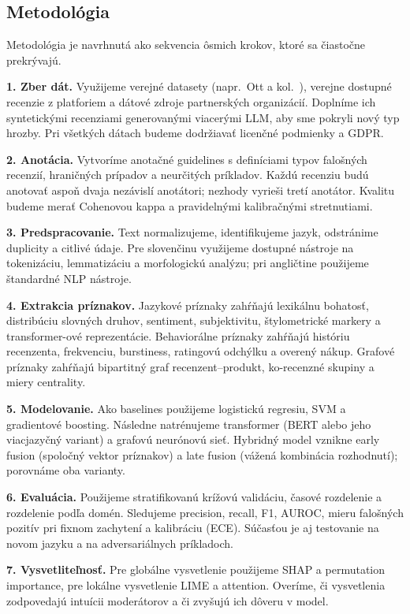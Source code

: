 \documentclass[11pt,a4paper]{article}
\begin{document}
\subsection{Metodológia}

Metodológia je navrhnutá ako sekvencia ôsmich krokov, ktoré sa čiastočne prekrývajú.

\textbf{1. Zber dát.} Využijeme verejné datasety (napr.\ Ott a kol.~\cite{ott2011}), verejne dostupné recenzie z platforiem a dátové zdroje partnerských organizácií. Doplníme ich syntetickými recenziami generovanými viacerými LLM, aby sme pokryli nový typ hrozby. Pri všetkých dátach budeme dodržiavať licenčné podmienky a GDPR.

\textbf{2. Anotácia.} Vytvoríme anotačné guidelines s definíciami typov falošných recenzií, hraničných prípadov a neurčitých príkladov. Každú recenziu budú anotovať aspoň dvaja nezávislí anotátori; nezhody vyrieši tretí anotátor. Kvalitu budeme merať Cohenovou kappa a pravidelnými kalibračnými stretnutiami.

\textbf{3. Predspracovanie.} Text normalizujeme, identifikujeme jazyk, odstránime duplicity a citlivé údaje. Pre slovenčinu využijeme dostupné nástroje na tokenizáciu, lemmatizáciu a morfologickú analýzu; pri angličtine použijeme štandardné NLP nástroje.

\textbf{4. Extrakcia príznakov.} Jazykové príznaky zahŕňajú lexikálnu bohatosť, distribúciu slovných druhov, sentiment, subjektivitu, štylometrické markery a transformer-ové reprezentácie. Behaviorálne príznaky zahŕňajú históriu recenzenta, frekvenciu, burstiness, ratingovú odchýlku a overený nákup. Grafové príznaky zahŕňajú bipartitný graf recenzent--produkt, ko-recenzné skupiny a miery centrality.

\textbf{5. Modelovanie.} Ako baselines použijeme logistickú regresiu, SVM a gradientové boosting. Následne natrénujeme transformer (BERT alebo jeho viacjazyčný variant) a grafovú neurónovú sieť. Hybridný model vznikne early fusion (spoločný vektor príznakov) a late fusion (vážená kombinácia rozhodnutí); porovnáme oba varianty.

\textbf{6. Evaluácia.} Použijeme stratifikovanú krížovú validáciu, časové rozdelenie a rozdelenie podľa domén. Sledujeme precision, recall, F1, AUROC, mieru falošných pozitív pri fixnom zachytení a kalibráciu (ECE). Súčasťou je aj testovanie na novom jazyku a na adversariálnych príkladoch.

\textbf{7. Vysvetliteľnosť.} Pre globálne vysvetlenie použijeme SHAP a permutation importance, pre lokálne vysvetlenie LIME a attention. Overíme, či vysvetlenia zodpovedajú intuícii moderátorov a či zvyšujú ich dôveru v model.
\end{document}

